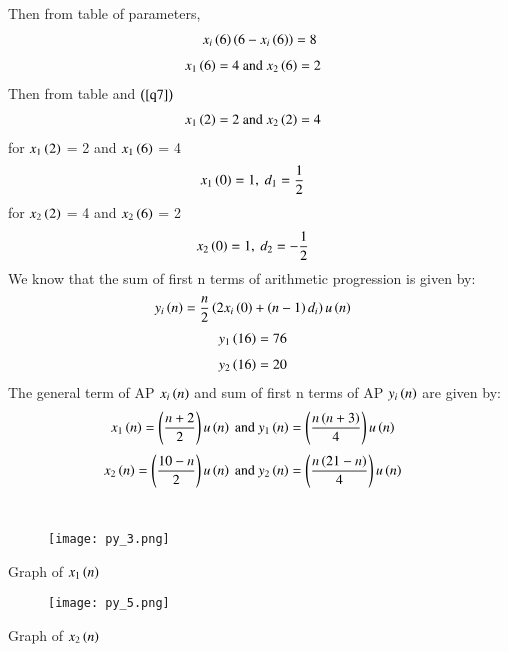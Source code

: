 \documentclass[beamer]{IEEEtran}
\theoremstyle{remark}
\begin{document}
Then from table of parameters,
\begin{align}
x_i\left(6\right)\left(6-x_i\left(6\right)\right)=8
\end{align}
\begin{align}
\label{q7}
    x_1\left(6\right)&=4\ \text{and}\ x_2\left(6\right)=2
\end{align}
Then from table and $\left(\ref{q7}\right)$
\begin{align}
\label{q8}
    x_1\left(2\right)&=2\ \text{and}\ x_2\left(2\right)=4
\end{align}
for $x_1\left(2\right)$ = 2 and $x_1\left(6\right)$ = 4
\begin{align}
x_1\left(0\right)&=1,\ d_1=\frac{1}{2}
\end{align}
for $x_2\left(2\right)$ = 4 and $x_2\left(6\right)$ = 2
\begin{align}
x_2\left(0\right)&=1,\ d_2=-\frac{1}{2}
\end{align}
We know that the sum of first n terms of arithmetic progression is given by:
\begin{align}
\label{q9}
y_i\left(n\right)&= \frac{n}{2}\left(2x_i\left(0\right)+\left(n-1\right)d_i\right)u\left(n\right)
\end{align}
\begin{align}
\label{11}
y_1\left(16\right)&=76
\end{align}
\begin{align}
\label{12}
y_2\left(16\right)&=20
\end{align}
The general term of AP $x_i\left(n\right)$ and sum of first n terms of AP $y_i\left(n\right)$ are given by:\\
\begin{align}
x_1\brak{n}&=\brak{\frac{n+2}{2}}u\brak{n}\ \text{and}\ y_1\brak{n}=\brak{\frac{n\brak{n+3}}{4}}u\brak{n}
\end{align}
\begin{align}
x_2\brak{n}&=\brak{\frac{10-n}{2}}u\brak{n}\ \text{and}\ y_2\brak{n}=\brak{\frac{n\brak{21-n}}{4}}u\brak{n}
\end{align}\\
\begin{figure}[h]
    \centering
    \texttt{[image: py\_3.png]}
    \label{fig:x1n}
\end{figure}
\begin{center}
    Graph of $x_1\left(n\right)$\\
\end{center}
\begin{figure}[h]
    \centering
    \texttt{[image: py\_5.png]}
    \label{fig:x2n}
\end{figure}
\begin{center}
    Graph of $x_2\left(n\right)$\\
\end{center}
\end{document}
